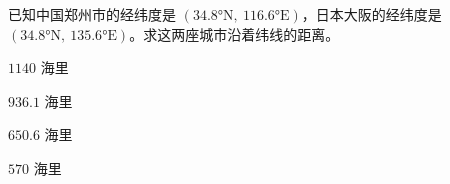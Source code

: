 \documentclass[12pt,a4paper]{exam-zh}
\begin{document}

    
    
    
\begin{question}
    已知中国郑州市的经纬度是 $(34.8°\text{N},\ 116.6°\text{E})$，日本大阪的经纬度是 $(34.8°\text{N},\ 135.6°\text{E})$。求这两座城市沿着纬线的距离。\paren[A]
    \begin{choices}
        \item $1140$ 海里 \item $936.1$ 海里 \item $650.6$ 海里 \item $570$ 海里
    \end{choices}
\end{question}
\end{document}
